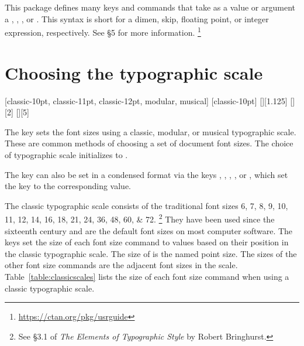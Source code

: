 \documentclass{beery}
\begin{document}


This package defines many keys and commands that take as a value or argument a , , , or .
This syntax is short for a dimen, skip, floating point, or integer expression, respectively.
See  \S5 for more information.%
\footnote{\url{https://ctan.org/pkg/usrguide}}


\section{Choosing the typographic scale}
\label{sec:choosing}

  [classic-10pt, classic-11pt, classic-12pt, modular, musical]
  [classic-10pt]
\newline
{}[][1.125]
\newline
{}[][2]%
\nopagebreak\newline
{}[][5]

The key  sets the font sizes using a classic, modular, or musical typographic scale.
These are common methods of choosing a set of document font sizes.
The choice of typographic scale initializes to .

The key  can also be set in a condensed format via the keys , , , , or , which set the key  to the corresponding value.

The classic typographic scale consists of the traditional font sizes
\numlist{6;7;8;9;10;11;12;14;16;18;21;24;36;48;60;72}.%
\footnote{See \S{}3.1 of \textit{The Elements of Typographic Style} by Robert Bringhurst.}
They have been used since the sixteenth century and are the default font sizes on most computer software.
The keys  set the size of each font size command to values based on their position in the classic typographic scale.
The size of  is the named point size.
The sizes of the other font size commands are the adjacent font sizes in the scale.
Table~\ref{table:classicscales} lists the size of each font size command when using a classic typographic scale.


\end{document}

